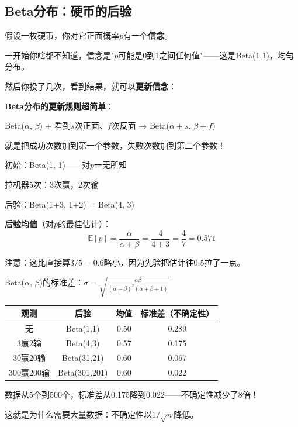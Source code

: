 \documentclass[11pt,a4paper]{article}
\theoremstyle{definition}
\begin{document}
\subsection{Beta分布：硬币的后验}

\begin{plainwords}[Beta分布是什么]
假设一枚硬币，你对它正面概率$p$有一个\textbf{信念}。

一开始你啥都不知道，信念是"$p$可能是0到1之间任何值"——这是Beta(1,1)，均匀分布。

然后你投了几次，看到结果，就可以\textbf{更新信念}：

\textbf{Beta分布的更新规则超简单}：

Beta($\alpha$, $\beta$) + 看到$s$次正面、$f$次反面 → Beta($\alpha+s$, $\beta+f$)

就是把成功次数加到第一个参数，失败次数加到第二个参数！
\end{plainwords}

\begin{calculation}[Beta更新的例子]
初始：Beta(1, 1)——对$p$一无所知

拉机器5次：3次赢，2次输

后验：Beta(1+3, 1+2) = Beta(4, 3)

\textbf{后验均值}（对$p$的最佳估计）：
\[
\mathbb{E}[p] = \frac{\alpha}{\alpha + \beta} = \frac{4}{4+3} = \frac{4}{7} = 0.571
\]

注意：这比直接算$3/5 = 0.6$略小，因为先验把估计往0.5拉了一点。
\end{calculation}

\begin{calculation}
Beta($\alpha$, $\beta$)的标准差：$\sigma = \sqrt{\frac{\alpha\beta}{(\alpha+\beta)^2(\alpha+\beta+1)}}$

\begin{center}
\begin{tabular}{c|c|c|c}
\toprule
观测 & 后验 & 均值 & 标准差（不确定性） \\
\midrule
无 & Beta(1,1) & 0.50 & 0.289 \\
3赢2输 & Beta(4,3) & 0.57 & 0.175 \\
30赢20输 & Beta(31,21) & 0.60 & 0.067 \\
300赢200输 & Beta(301,201) & 0.60 & 0.022 \\
\bottomrule
\end{tabular}
\end{center}

数据从5个到500个，标准差从0.175降到0.022——不确定性减少了8倍！

这就是为什么需要大量数据：不确定性以$1/\sqrt{n}$降低。
\end{calculation}
\end{document}
